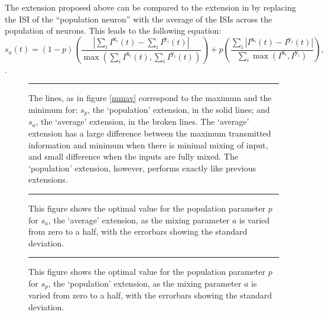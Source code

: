 The extension proposed above can be compared to the extension in \citep{KreuzEtAl2009b} by replacing the ISI of the ``population neuron'' with the average of the ISIs across the population of neurons.  This leads to the following equation: 
\begin{equation}
\label{av}
s_a(t) = (1-p) \left(\frac{ | \sum_i I^{\mathbf{x}_i}(t) - \sum_i I^{\mathbf{y}_i}(t) |}{\max (\sum_i I^{\mathbf{x}_i}(t),\sum_i I^{\mathbf{y}_i}(t) )}  \right) + p\left( \frac{\sum_i | I^{\mathbf{x}_i}(t) - I^{\mathbf{y}_i}(t) |}{\sum_i \max (I^{\mathbf{x}_i},I^{\mathbf{y}_i})} \right),
\end{equation}.


\begin{figure}[htb]

\bigskip
\rule{31.5em}{0.5pt}
\caption{\label{avvspoppic}The lines, as in figure \ref{mmav} correspond to the maximum and the minimum for: $s_p$, the \lq{}population\rq{} extension, in the solid lines; and $s_a$, the \lq{}average\rq{} extension, in the broken lines.  The \lq{}average\rq{} extension has a large difference between the maximum transmitted information and minimum when there is minimal mixing of input, and small difference when the inputs are fully mixed. The \lq{}population\rq{} extension, however, performs exactly like previous extensions.}
\end{figure}

\begin{figure}[htb]

\bigskip
\rule{31.5em}{0.5pt}
\caption{\label{bestpav}This figure shows the optimal value for the population parameter $p$ for $s_a$, the \lq{}average\rq{} extension, as the mixing parameter $a$ is varied from zero to a half, with the errorbars showing the standard deviation.}
\end{figure}

\begin{figure}[htb]

\bigskip
\rule{31.5em}{0.5pt}
\caption{\label{bestppop}This figure shows the optimal value for the population parameter $p$ for $s_p$, the \lq{}population\rq{} extension, as the mixing parameter $a$ is varied from zero to a half, with the errorbars showing the standard deviation.}
\end{figure}
%

